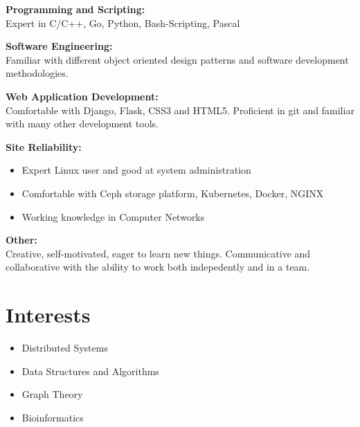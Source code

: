 \documentclass[margin]{res}
\begin{document}
\begin{resume}
	{\bf Programming and Scripting:}
	\\Expert in C/C++, Go, Python, Bash-Scripting, Pascal

    {\bf Software Engineering:}
    \\Familiar with different object oriented design patterns and software development methodologies.

	{\bf Web Application Development:}
	\\Comfortable with Django, Flask, CSS3 and HTML5. Proficient in git and familiar with many other development tools.

	{\bf Site Reliability:}
	\begin{itemize}
		\item Expert Linux user and good at system administration
		\item Comfortable with Ceph storage platform, Kubernetes, Docker, NGINX
		\item Working knowledge in Computer Networks
	\end{itemize}

	{\bf Other:}
	\\Creative, self-motivated, eager to learn new things. Communicative and collaborative with the ability to work both indepedently and in a team.

\section{Interests}
\begin{itemize}[leftmargin=0mm]
	\item Distributed Systems
	\item Data Structures and Algorithms
	\item Graph Theory
	\item Bioinformatics

\end{itemize}

\end{resume}
\end{document}
